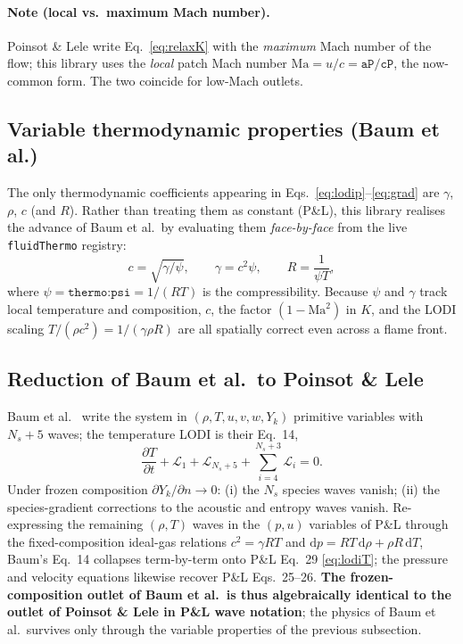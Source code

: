 \documentclass[11pt,a4paper]{article}
\newcommand{\dt}[1]{\frac{\partial #1}{\partial t}}
\newcommand{\Lc}{\mathcal{L}}
\newcommand{\code}[1]{\texttt{#1}}
\begin{document}
\paragraph{Note (local vs.\ maximum Mach number).} Poinsot \& Lele write
Eq.~\eqref{eq:relaxK} with the \emph{maximum} Mach number of the flow; this
library uses the \emph{local} patch Mach number $\mathrm{Ma}=u/c=\code{aP/cP}$,
the now-common form. The two coincide for low-Mach outlets.

\subsection{Variable thermodynamic properties (Baum et al.)}
The only thermodynamic coefficients appearing in
Eqs.~\eqref{eq:lodip}--\eqref{eq:grad} are $\gamma$, $\rho$, $c$ (and
$R$). Rather than treating them as constant (P\&L), this library realises the
advance of Baum et al.\ by evaluating them \emph{face-by-face} from the live
\code{fluidThermo} registry:
\[
  c=\sqrt{\gamma/\psi},\qquad \gamma=c^2\psi,\qquad R=\frac{1}{\psi T},
\]
where $\psi=\code{thermo:psi}=1/(RT)$ is the compressibility. Because $\psi$ and
$\gamma$ track local temperature and composition, $c$, the factor
$(1-\mathrm{Ma}^2)$ in $K$, and the LODI scaling $T/(\rho c^2)=1/(\gamma\rho R)$
are all spatially correct even across a flame front.

\subsection{Reduction of Baum et al.\ to Poinsot \& Lele}\label{sec:frozen}
Baum et al.~\cite{BPT94} write the system in $(\rho,T,u,v,w,Y_k)$ primitive
variables with $N_s+5$ waves; the temperature LODI is their Eq.~14,
\[
  \dt{T}+\Lc_1+\Lc_{N_s+5}+\textstyle\sum_{i=4}^{N_s+3}\Lc_i=0 .
\]
Under frozen composition $\partial Y_k/\partial n\to0$: (i) the $N_s$ species
waves vanish; (ii) the species-gradient corrections to the acoustic and entropy
waves vanish. Re-expressing the remaining $(\rho,T)$ waves in the $(p,u)$
variables of P\&L through the fixed-composition ideal-gas relations
$c^2=\gamma R T$ and $\mathrm dp=RT\,\mathrm d\rho+\rho R\,\mathrm dT$, Baum's
Eq.~14 collapses term-by-term onto P\&L Eq.~29 \eqref{eq:lodiT}; the pressure
and velocity equations likewise recover P\&L Eqs.~25--26. \textbf{The
frozen-composition outlet of Baum et al.\ is thus algebraically identical to
the outlet of Poinsot \& Lele in P\&L wave notation}; the physics of Baum et
al.\ survives only through the variable properties of the previous subsection.
\end{document}
